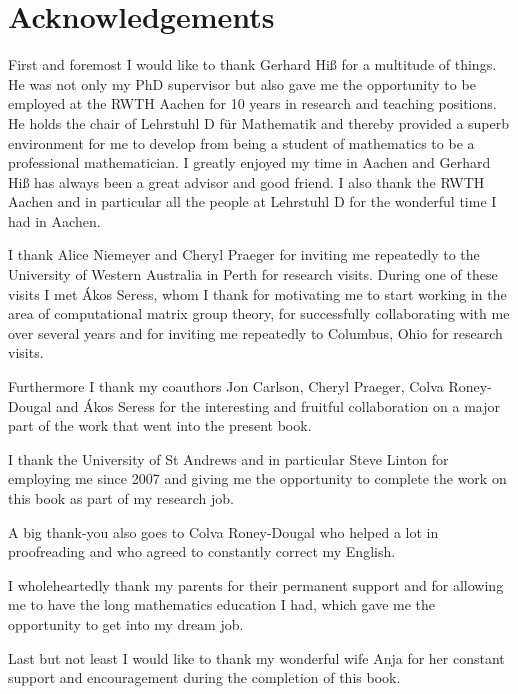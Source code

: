 \section{Acknowledgements}

First and foremost I would like to thank Gerhard Hi\ss{} for a multitude
of things. He was not only my PhD supervisor but also gave me the
opportunity to be employed at the RWTH Aachen for 10 years in research
and teaching positions. He holds the chair of Lehrstuhl D f\"ur
Mathematik and thereby provided a superb environment for me to develop
from being a student of mathematics to be a professional mathematician.
I greatly enjoyed my time in Aachen and Gerhard Hi\ss{} has always been a
great advisor and good friend. I also thank the RWTH Aachen and in
particular all the people at Lehrstuhl D for the wonderful time I had
in Aachen.

I thank Alice Niemeyer and Cheryl Praeger for inviting me
repeatedly to the University of Western Australia in Perth for
research visits. During one of these visits I met \'Akos Seress, whom
I thank for motivating me to start working in the area of
computational matrix group theory, for successfully collaborating with
me over several years and for inviting me repeatedly to Columbus, Ohio
for research visits.

Furthermore I thank my coauthors Jon Carlson, Cheryl Praeger, 
Colva Roney-Dougal and \'Akos Seress for the interesting and fruitful
collaboration on a major part of the work that went into the present book.

I thank the University of St Andrews and in particular Steve Linton
for employing me since 2007 and giving me the opportunity to complete
the work on this book as part of my research job.

A big thank-you also goes to Colva Roney-Dougal who helped a lot in
proofreading and who agreed to constantly correct my English.

I wholeheartedly thank my parents for their permanent support and
for allowing me to have the long mathematics education I had, which
gave me the opportunity to get into my dream job.

Last but not least I would like to thank my wonderful wife Anja for
her constant support and encouragement during the completion of this
book.

\renewcommand{\thechapter}{\Roman{chapter}}
